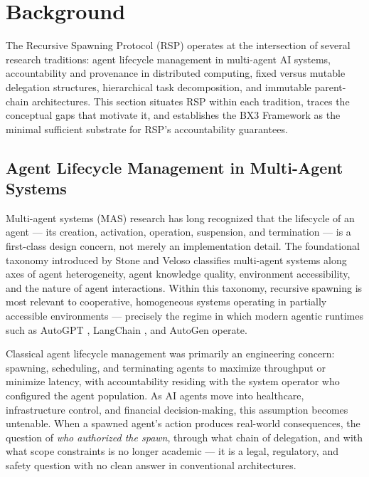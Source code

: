 \section{Background}
\label{sec:rs-background}

The Recursive Spawning Protocol (RSP) operates at the intersection of several research traditions: agent lifecycle management in multi-agent AI systems, accountability and provenance in distributed computing, fixed versus mutable delegation structures, hierarchical task decomposition, and immutable parent-chain architectures. This section situates RSP within each tradition, traces the conceptual gaps that motivate it, and establishes the BX3 Framework as the minimal sufficient substrate for RSP's accountability guarantees.

\subsection{Agent Lifecycle Management in Multi-Agent Systems}

Multi-agent systems (MAS) research has long recognized that the lifecycle of an agent --- its creation, activation, operation, suspension, and termination --- is a first-class design concern, not merely an implementation detail. The foundational taxonomy introduced by Stone and Veloso \cite{stone2000} classifies multi-agent systems along axes of agent heterogeneity, agent knowledge quality, environment accessibility, and the nature of agent interactions. Within this taxonomy, recursive spawning is most relevant to cooperative, homogeneous systems operating in partially accessible environments --- precisely the regime in which modern agentic runtimes such as AutoGPT \cite{autoGPT2023}, LangChain \cite{langchain2023}, and AutoGen \cite{autogen2023} operate.

Classical agent lifecycle management was primarily an engineering concern: spawning, scheduling, and terminating agents to maximize throughput or minimize latency, with accountability residing with the system operator who configured the agent population. As AI agents move into healthcare, infrastructure control, and financial decision-making, this assumption becomes untenable. When a spawned agent's action produces real-world consequences, the question of \emph{who authorized the spawn}, through what chain of delegation, and with what scope constraints is no longer academic --- it is a legal, regulatory, and safety question with no clean answer in conventional architectures.

